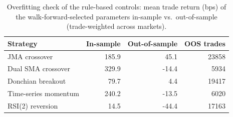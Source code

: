 \begin{longtable}{l r r r}
\caption{Overfitting check of the rule-based controls: mean trade return (bps) of the walk-forward-selected parameters in-sample vs.\ out-of-sample (trade-weighted across markets).} \label{tab:s2decay} \\
\toprule
Strategy & In-sample & Out-of-sample & OOS trades \\
\midrule
\endhead
\bottomrule
\endfoot
JMA crossover & 185.9 & 45.1 & 23858 \\
Dual SMA crossover & 329.9 & -14.4 & 5934 \\
Donchian breakout & 79.7 & 4.4 & 19417 \\
Time-series momentum & 240.2 & -13.5 & 6020 \\
RSI(2) reversion & 14.5 & -44.4 & 17163 \\
\end{longtable}
